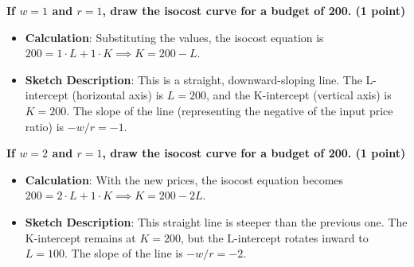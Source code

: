 \documentclass[11pt, letterpaper]{article}
\begin{document}
\textbf{If $w=1$ and $r=1$, draw the isocost curve for a budget of 200. (1 point)}
\begin{itemize}[leftmargin=*]
    \item \textbf{Calculation}: Substituting the values, the isocost equation is $200 = 1 \cdot L + 1 \cdot K \implies K = 200 - L$.
    \item \textbf{Sketch Description}: This is a straight, downward-sloping line. The L-intercept (horizontal axis) is $L=200$, and the K-intercept (vertical axis) is $K=200$. The slope of the line (representing the negative of the input price ratio) is $-w/r = -1$.
\end{itemize}
\begin{center}
\end{center}

\textbf{If $w=2$ and $r=1$, draw the isocost curve for a budget of 200. (1 point)}
\begin{itemize}[leftmargin=*]
    \item \textbf{Calculation}: With the new prices, the isocost equation becomes $200 = 2 \cdot L + 1 \cdot K \implies K = 200 - 2L$.
    \item \textbf{Sketch Description}: This straight line is steeper than the previous one. The K-intercept remains at $K=200$, but the L-intercept rotates inward to $L=100$. The slope of the line is $-w/r = -2$.
\end{itemize}
\begin{center}
\end{center}
\end{document}
